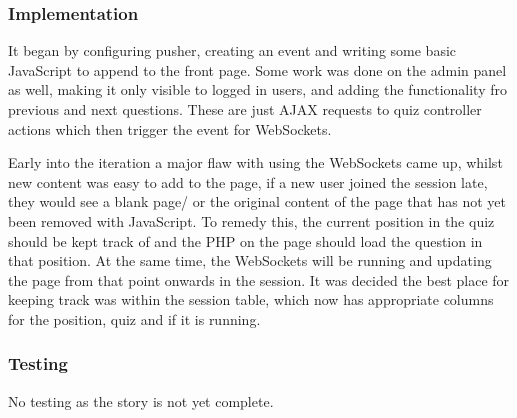 \begin{center}
\begin{figure}
		\label{fig:quiz-mobile}
	\end{figure}
\end{center}


\subsubsection{Implementation}
It began by configuring pusher, creating an event and writing some basic JavaScript to append to the front page. Some work was done on the admin panel as well, making it only visible to logged in users, and adding the functionality fro previous and next questions. These are just AJAX requests to quiz controller actions which then trigger the event for WebSockets.

Early into the iteration a major flaw with using the WebSockets came up, whilst new content was easy to add to the page, if a new user joined the session late, they would see a blank page/ or the original content of the page that has not yet been removed with JavaScript. To remedy this, the current position in the quiz should be kept track of and the PHP on the page should load the question in that position. At the same time, the WebSockets will be running and updating the page from that point onwards in the session. It was decided the best place for keeping track was within the session table, which now has appropriate columns for the position, quiz and if it is running.
\subsubsection{Testing}
No testing as the story is not yet complete.
\newpage
